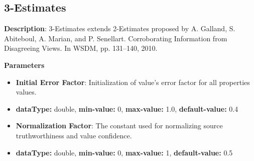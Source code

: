 \documentclass[a4paper,10pt]{scrartcl}
\begin{document}
\subsection{3-Estimates}
\begin{description}
\item \textbf{Description}: 3-Estimates extends 2-Estimates proposed by A. Galland, S. Abiteboul, A. Marian, and P. Senellart. Corroborating Information from Disagreeing Views. In WSDM, pp. 131–140, 2010.
\item \textbf{Parameters}
\begin{itemize}
\item \textbf{Initial Error Factor}: Initialization of value's error factor for all properties values.
\item[]\textbf{dataType: }double, \textbf{min-value: }0, \textbf{max-value: }1.0, \textbf{default-value: }0.4\item \textbf{Normalization Factor}: The constant used for normalizing source truthworthiness and value confidence.
\item[]\textbf{dataType: }double, \textbf{min-value: }0, \textbf{max-value: }1, \textbf{default-value: }0.5\end{itemize}
\end{description}
\end{document}

